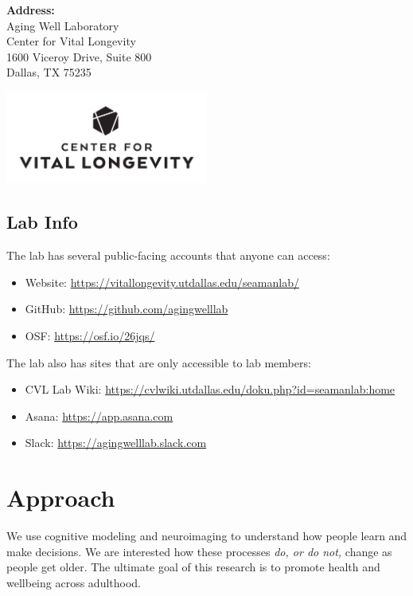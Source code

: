 \documentclass[]{book}
\providecommand{\tightlist}{%
  \setlength{\itemsep}{0pt}\setlength{\parskip}{0pt}}
\begin{document}
\textbf{Address:}\\
Aging Well Laboratory\\
Center for Vital Longevity\\
1600 Viceroy Drive, Suite 800\\
Dallas, TX 75235

\includegraphics[width=0.5\textwidth,height=\textheight]{images/CVL-B-Stacked.png}

\hypertarget{lab-info}{%
\section{Lab Info}\label{lab-info}}

The lab has several public-facing accounts that anyone can access:

\begin{itemize}
\tightlist
\item
  Website: \url{https://vitallongevity.utdallas.edu/seamanlab/}
\item
  GitHub: \url{https://github.com/agingwelllab}
\item
  OSF: \url{https://osf.io/26jqs/}
\end{itemize}

The lab also has sites that are only accessible to lab members:

\begin{itemize}
\tightlist
\item
  CVL Lab Wiki: \url{https://cvlwiki.utdallas.edu/doku.php?id=seamanlab:home}
\item
  Asana: \url{https://app.asana.com}
\item
  Slack: \url{https://agingwelllab.slack.com}
\end{itemize}

\hypertarget{approach}{%
\chapter{Approach}\label{approach}}

We use cognitive modeling and neuroimaging to understand how people learn and make decisions. We are interested how these processes \emph{do, or do not,} change as people get older. The ultimate goal of this research is to promote health and wellbeing across adulthood.
\end{document}
